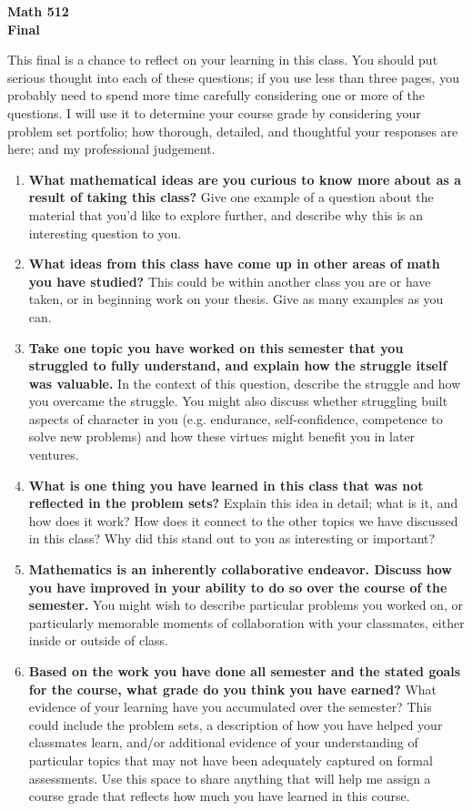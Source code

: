 \documentclass{article}
\begin{document}
\begin{center}
\textbf{Math 512 \\ Final}
\end{center}

This final is a chance to reflect on your learning in this class. You should put serious thought into each of these questions; if you use less than three pages, you probably need to spend more time carefully considering one or more of the questions.  I will use it to determine your course grade by considering your problem set portfolio; how thorough, detailed, and thoughtful your responses are here; and my professional judgement.

\begin{enumerate}
\item \textbf{What mathematical ideas are you curious to know more about as a result of taking this class?}  Give one example of a question about the material that you'd like to explore further, and describe why this is an interesting question to you.

\item \textbf{What ideas from this class have come up in other areas of math you have studied?}  This could be within another class you are or have taken, or in beginning work on your thesis. Give as many examples as you can.

\item \textbf{Take one topic you have worked on this semester that you struggled to fully understand, and explain how the struggle itself was valuable.}  In the context of this question, describe the struggle and how you overcame the struggle. You might also discuss whether struggling built aspects of character in you (e.g. endurance, self-confidence, competence to solve new problems) and how these virtues might benefit you in later ventures.

\item \textbf{What is one thing you have learned in this class that was not reflected in the problem sets?}  Explain this idea in detail; what is it, and how does it work? How does it connect to the other topics we have discussed in this class?  Why did this stand out to you as interesting or important?

\item \textbf{Mathematics is an inherently collaborative endeavor. Discuss how you have improved in your ability to do so over the course of the semester.} You might wish to describe particular problems you worked on, or particularly memorable moments of collaboration with your classmates, either inside or outside of class. 

\item \textbf{Based on the work you have done all semester and the stated goals for the course, what grade do you think you have earned?} What evidence of your learning have you accumulated over the semester? This could include the problem sets, a description of how you have helped your classmates learn, and/or additional evidence of your understanding of particular topics that may not have been adequately captured on formal assessments. Use this space to share anything that will help me assign a course grade that reflects how much you have learned in this course.
\end{enumerate}
\end{document}
